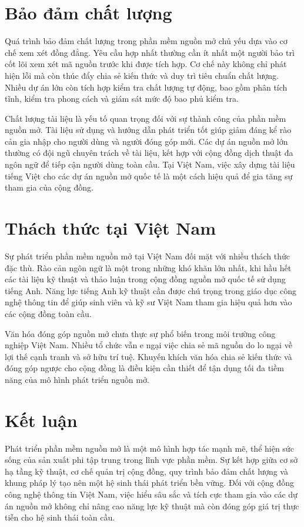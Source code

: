 \documentclass[
    language=vietnamese,
    doctype=article,
]{../../omnilatex}
\begin{document}
\section{Bảo đảm chất lượng}
Quá trình bảo đảm chất lượng trong phần mềm nguồn mở chủ yếu dựa vào cơ chế xem xét đồng đẳng. Yêu cầu hợp nhất thường cần ít nhất một người bảo trì cốt lõi xem xét mã nguồn trước khi được tích hợp. Cơ chế này không chỉ phát hiện lỗi mà còn thúc đẩy chia sẻ kiến thức và duy trì tiêu chuẩn chất lượng. Nhiều dự án lớn còn tích hợp kiểm tra chất lượng tự động, bao gồm phân tích tĩnh, kiểm tra phong cách và giám sát mức độ bao phủ kiểm tra.

Chất lượng tài liệu là yếu tố quan trọng đối với sự thành công của phần mềm nguồn mở. Tài liệu sử dụng và hướng dẫn phát triển tốt giúp giảm đáng kể rào cản gia nhập cho người dùng và người đóng góp mới. Các dự án nguồn mở lớn thường có đội ngũ chuyên trách về tài liệu, kết hợp với cộng đồng dịch thuật đa ngôn ngữ để tiếp cận người dùng toàn cầu. Tại Việt Nam, việc xây dựng tài liệu tiếng Việt cho các dự án nguồn mở quốc tế là một cách hiệu quả để gia tăng sự tham gia của cộng đồng.

\section{Thách thức tại Việt Nam}
Sự phát triển phần mềm nguồn mở tại Việt Nam đối mặt với nhiều thách thức đặc thù. Rào cản ngôn ngữ là một trong những khó khăn lớn nhất, khi hầu hết các tài liệu kỹ thuật và thảo luận trong cộng đồng nguồn mở quốc tế sử dụng tiếng Anh. Năng lực tiếng Anh kỹ thuật cần được chú trọng trong giáo dục công nghệ thông tin để giúp sinh viên và kỹ sư Việt Nam tham gia hiệu quả hơn vào các cộng đồng toàn cầu.

Văn hóa đóng góp nguồn mở chưa thực sự phổ biến trong môi trường công nghiệp Việt Nam. Nhiều tổ chức vẫn e ngại việc chia sẻ mã nguồn do lo ngại về lợi thế cạnh tranh và sở hữu trí tuệ. Khuyến khích văn hóa chia sẻ kiến thức và đóng góp ngược cho cộng đồng là điều kiện cần thiết để tận dụng tối đa tiềm năng của mô hình phát triển nguồn mở.

\section{Kết luận}
Phát triển phần mềm nguồn mở là một mô hình hợp tác mạnh mẽ, thể hiện sức sống của sản xuất phi tập trung trong lĩnh vực phần mềm. Sự kết hợp giữa cơ sở hạ tầng kỹ thuật, cơ chế quản trị cộng đồng, quy trình bảo đảm chất lượng và khung pháp lý tạo nên một hệ sinh thái phát triển bền vững. Đối với cộng đồng công nghệ thông tin Việt Nam, việc hiểu sâu sắc và tích cực tham gia vào các dự án nguồn mở không chỉ nâng cao năng lực kỹ thuật mà còn đóng góp giá trị thực tiễn cho hệ sinh thái toàn cầu.
\end{document}
